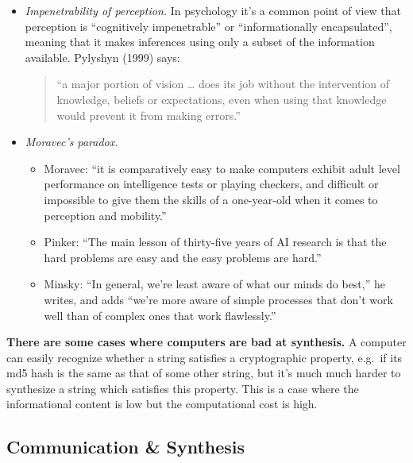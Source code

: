 \documentclass[
  11pt,
  letterpaper,
  DIV=11,
  numbers=noendperiod,
  oneside]{scrartcl}
\providecommand{\tightlist}{%
  \setlength{\itemsep}{0pt}\setlength{\parskip}{0pt}}\usepackage{longtable,booktabs,array}
\begin{document}
\begin{itemize}
\item
  \emph{Impenetrability of perception.} In psychology it's a common
  point of view that perception is ``cognitively impenetrable'' or
  ``informationally encapsulated'', meaning that it makes inferences
  using only a subset of the information available. Pylyshyn (1999)
  says:

  \begin{quote}
  ``a major portion of vision \ldots{} does its job without the
  intervention of knowledge, beliefs or expectations, even when using
  that knowledge would prevent it from making errors.''
  \end{quote}
\item
  \emph{Moravec's paradox.}

  \begin{itemize}
  \tightlist
  \item
    Moravec: ``it is comparatively easy to make computers exhibit adult
    level performance on intelligence tests or playing checkers, and
    difficult or impossible to give them the skills of a one-year-old
    when it comes to perception and mobility.''
  \item
    Pinker: ``The main lesson of thirty-five years of AI research is
    that the hard problems are easy and the easy problems are hard.''
  \item
    Minsky: ``In general, we're least aware of what our minds do best,''
    he writes, and adds ``we're more aware of simple processes that
    don't work well than of complex ones that work flawlessly.''
  \end{itemize}
\end{itemize}

\textbf{There are some cases where computers are bad at synthesis.} A
computer can easily recognize whether a string satisfies a cryptographic
property, e.g.~if its md5 hash is the same as that of some other string,
but it's much much harder to synthesize a string which satisfies this
property. This is a case where the informational content is low but the
computational cost is high.

\hypertarget{communication-synthesis}{%
\subsection{Communication \& Synthesis}\label{communication-synthesis}}
\end{document}
